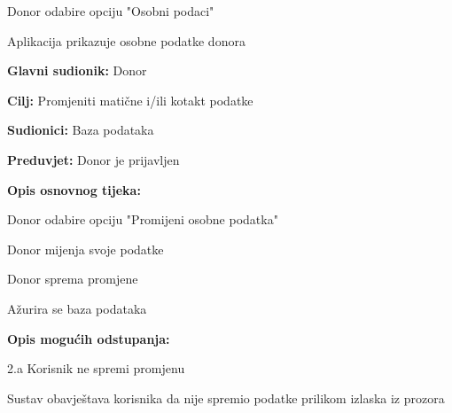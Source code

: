 \documentclass[11pt]{book}
\begin{document}
\begin{packed_item}
\begin{packed_item}
						\item[] \begin{packed_enum}
	
							\item Donor odabire opciju "Osobni podaci"
							\item Aplikacija prikazuje osobne podatke donora
							
						\end{packed_enum}

					\end{packed_item}

\noindent {}
					\begin{packed_item}
	
						\item \textbf{Glavni sudionik: }Donor
						\item \textbf{Cilj:} Promjeniti matične i/ili kotakt podatke
						\item \textbf{Sudionici:} Baza podataka
						\item \textbf{Preduvjet:} Donor je prijavljen
						\item \textbf{Opis osnovnog tijeka:}
						
						\item[] \begin{packed_enum}
	
							\item Donor odabire opciju "Promijeni osobne podatka"
							\item Donor mijenja svoje podatke
							\item Donor sprema promjene
							\item Ažurira se baza podataka
							
						\end{packed_enum}

						\item  \textbf{Opis mogućih odstupanja:}
						
						\item[] \begin{packed_item}
	
							\item[2.a] Korisnik ne spremi promjenu
							\item[] \begin{packed_enum}
								
								\item  Sustav obavještava korisnika da nije spremio podatke prilikom izlaska iz prozora


\end{packed_enum}
\end{packed_item}
\end{packed_item}
\end{packed_item}
\end{document}
